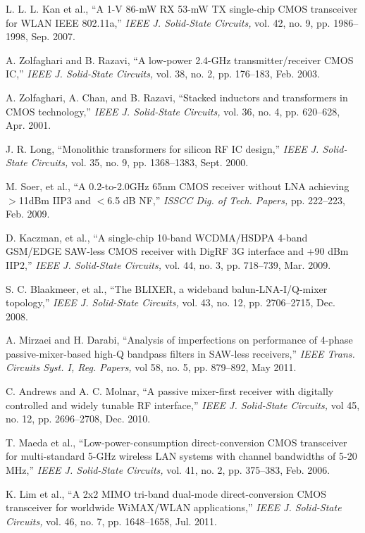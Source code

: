 \begin{thebibliography}{9}

 L. L. L. Kan et al., ``A 1-V 86-mW RX 53-mW TX single-chip CMOS transceiver for WLAN IEEE 802.11a,'' {\em IEEE J. Solid-State Circuits,} 
vol. 42, no. 9, pp. 1986--1998, Sep. 2007.

 A. Zolfaghari and B. Razavi, ``A low-power 2.4-GHz transmitter/receiver CMOS IC,'' {\em IEEE J. Solid-State Circuits,} vol. 38,
no. 2, pp. 176--183, Feb. 2003.

 A. Zolfaghari, A. Chan, and B. Razavi, ``Stacked inductors and transformers in CMOS technology,'' {\em IEEE J. Solid-State Circuits,} vol.
36, no. 4, pp. 620--628, Apr. 2001.

 J. R. Long, ``Monolithic transformers for silicon RF IC design,'' {\em IEEE J. Solid-State Circuits,} vol.
35, no. 9, pp. 1368--1383, Sept. 2000.

 M. Soer, et al., ``A 0.2-to-2.0GHz 65nm CMOS receiver without LNA achieving $>$11dBm IIP3 and $<$6.5 dB NF,'' {\em ISSCC Dig.
of Tech. Papers,} pp. 222--223, Feb. 2009.

 D. Kaczman, et al., ``A single-chip 10-band WCDMA/HSDPA 4-band GSM/EDGE SAW-less CMOS receiver with DigRF 3G interface
and +90 dBm IIP2,'' {\em IEEE J. Solid-State Circuits,} vol. 44, no. 3, pp. 718--739, Mar. 2009.

 S. C. Blaakmeer, et al., ``The BLIXER, a wideband balun-LNA-I/Q-mixer topology,'' {\em IEEE J. Solid-State Circuits,} vol. 43,
no. 12, pp. 2706--2715, Dec. 2008.

 A. Mirzaei and H. Darabi, ``Analysis of imperfections on performance of 4-phase passive-mixer-based high-Q bandpass filters in SAW-less
receivers,'' {\em IEEE Trans. Circuits Syst. I, Reg. Papers,} vol 58, no. 5, pp. 879--892, May 2011.

 C. Andrews and A. C. Molnar, ``A passive mixer-first receiver with digitally controlled and widely tunable RF interface,'' {\em
IEEE J. Solid-State Circuits,} vol 45, no. 12, pp. 2696--2708, Dec. 2010. 

 T. Maeda et al., ``Low-power-consumption direct-conversion CMOS transceiver for multi-standard 5-GHz wireless LAN systems with channel
bandwidths of 5-20 MHz,'' {\em IEEE J. Solid-State Circuits,} 
vol. 41, no. 2, pp. 375--383, Feb. 2006.

 K. Lim et al., ``A 2x2 MIMO tri-band dual-mode direct-conversion CMOS transceiver for worldwide WiMAX/WLAN applications,'' {\em IEEE J. Solid-State
Circuits,} vol. 46, no. 7, pp. 1648--1658, Jul. 2011.



\end{thebibliography}




















